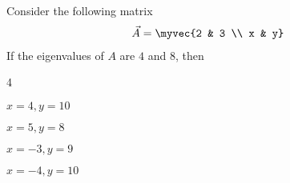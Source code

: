 		\item Consider the following matrix
		\begin{align*}
			\vec{A} = \myvec{2 & 3 \\ x & y}
		\end{align*}
		If the eigenvalues of $A$ are $4$ and $8$, then
		\hfill{}
		
		\begin{enumerate}
		\end{enumerate}
		
